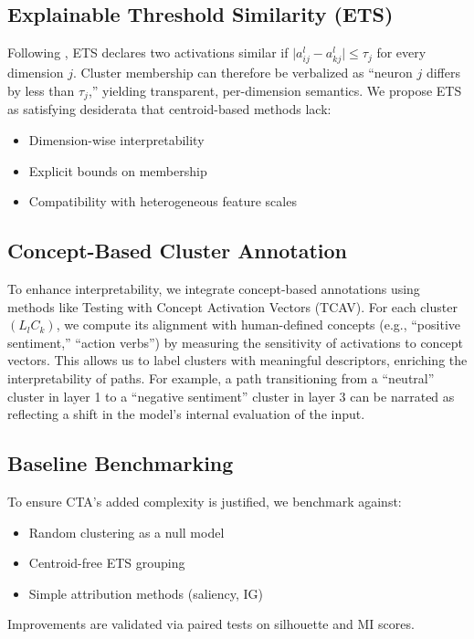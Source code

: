 \subsection{Explainable Threshold Similarity (ETS)}

Following \citet{kovalerchuk2024}, ETS declares two activations similar if $\bigl|a_{ij}^l - a_{kj}^l\bigr| \leq \tau_j$ for every dimension $j$. Cluster membership can therefore be verbalized as ``neuron $j$ differs by less than $\tau_j$,'' yielding transparent, per-dimension semantics. We propose ETS as satisfying desiderata that centroid-based methods lack:
\begin{itemize}
    \item Dimension-wise interpretability
    \item Explicit bounds on membership
    \item Compatibility with heterogeneous feature scales
\end{itemize}

\subsection{Concept-Based Cluster Annotation}

To enhance interpretability, we integrate concept-based annotations using methods like Testing with Concept Activation Vectors (TCAV). For each cluster $(L_lC_k)$, we compute its alignment with human-defined concepts (e.g., ``positive sentiment,'' ``action verbs'') by measuring the sensitivity of activations to concept vectors. This allows us to label clusters with meaningful descriptors, enriching the interpretability of paths. For example, a path transitioning from a ``neutral'' cluster in layer 1 to a ``negative sentiment'' cluster in layer 3 can be narrated as reflecting a shift in the model's internal evaluation of the input.

\subsection{Baseline Benchmarking}

To ensure CTA's added complexity is justified, we benchmark against:
\begin{itemize}
    \item Random clustering as a null model
    \item Centroid-free ETS grouping
    \item Simple attribution methods (saliency, IG) 
\end{itemize}
Improvements are validated via paired tests on silhouette and MI scores.